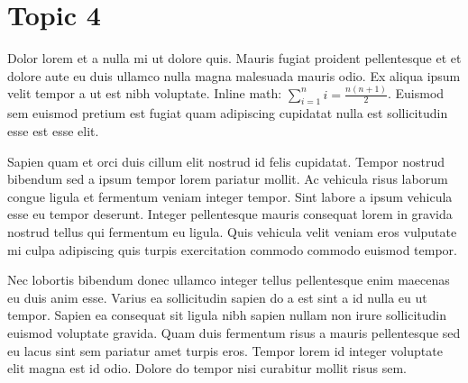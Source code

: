 \documentclass[11pt,a4paper]{article}
\begin{document}
\section{Topic 4}
Dolor lorem et a nulla mi ut dolore quis. Mauris fugiat proident
pellentesque et et dolore aute eu duis ullamco nulla magna malesuada
mauris odio. Ex aliqua ipsum velit tempor a ut est nibh voluptate.
Inline math: $\sum_{i=1}^{n} i = \frac{n(n+1)}{2}$. Euismod sem euismod
pretium est fugiat quam adipiscing cupidatat nulla est sollicitudin esse
est esse elit.

Sapien quam et orci duis cillum elit nostrud id felis cupidatat. Tempor
nostrud bibendum sed a ipsum tempor lorem pariatur mollit. Ac vehicula
risus laborum congue ligula et fermentum veniam integer tempor. Sint
labore a ipsum vehicula esse eu tempor deserunt. Integer pellentesque
mauris consequat lorem in gravida nostrud tellus qui fermentum eu
ligula. Quis vehicula velit veniam eros vulputate mi culpa adipiscing
quis turpis exercitation commodo commodo euismod tempor.

Nec lobortis bibendum donec ullamco integer tellus pellentesque enim
maecenas eu duis anim esse. Varius ea sollicitudin sapien do a est sint
a id nulla eu ut tempor. Sapien ea consequat sit ligula nibh sapien
nullam non irure sollicitudin euismod voluptate gravida. Quam duis
fermentum risus a mauris pellentesque sed eu lacus sint sem pariatur
amet turpis eros. Tempor lorem id integer voluptate elit magna est id
odio. Dolore do tempor nisi curabitur mollit risus sem.
\end{document}
